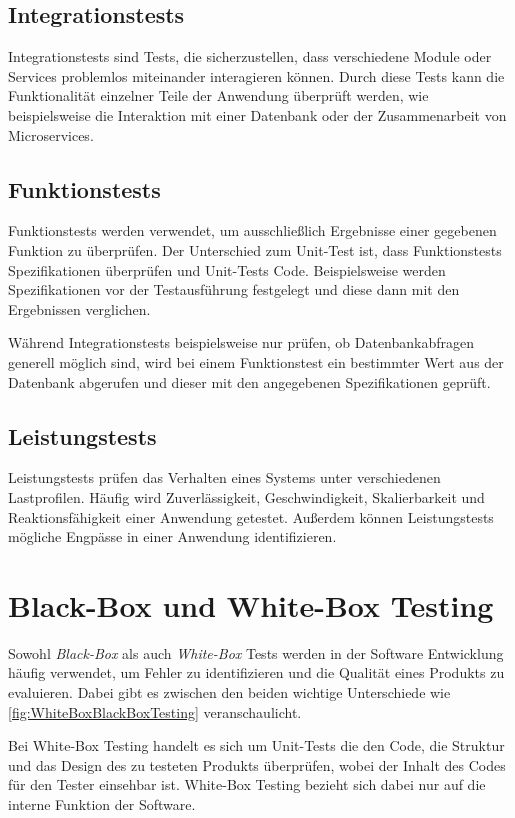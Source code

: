 \documentclass[a4paper, fontsize=11pt, parskip=half, twoside, headings=openright]{scrreprt}
\begin{document}
	\subsection{Integrationstests}
	Integrationstests sind Tests, die sicherzustellen, dass verschiedene Module oder Services problemlos miteinander interagieren können. 
	Durch diese Tests kann die Funktionalität einzelner Teile der Anwendung überprüft werden, wie beispielsweise die Interaktion mit einer Datenbank oder der Zusammenarbeit von Microservices.
	
	\subsection{Funktionstests}
	Funktionstests werden verwendet, um ausschließlich Ergebnisse einer gegebenen Funktion zu überprüfen.
	Der Unterschied zum Unit-Test ist, dass Funktionstests Spezifikationen überprüfen und Unit-Tests Code.
	Beispielsweise werden Spezifikationen vor der Testausführung festgelegt und diese dann mit den Ergebnissen verglichen.
	
	Während Integrationstests beispielsweise nur prüfen, ob Datenbankabfragen generell möglich sind, wird bei einem Funktionstest ein bestimmter Wert aus der Datenbank abgerufen und dieser mit den angegebenen Spezifikationen geprüft.
	
	\subsection{Leistungstests}
	Leistungstests prüfen das Verhalten eines Systems unter verschiedenen Lastprofilen. 
	Häufig wird Zuverlässigkeit, Geschwindigkeit, Skalierbarkeit und Reaktionsfähigkeit einer Anwendung getestet. 
	Außerdem können Leistungstests mögliche Engpässe in einer Anwendung identifizieren.
	
	
	\section{Black-Box und White-Box Testing}
	Sowohl \emph{Black-Box} als auch \emph{White-Box} Tests werden in der Software Entwicklung häufig verwendet, um Fehler zu identifizieren und die Qualität eines Produkts zu evaluieren. 
	Dabei gibt es zwischen den beiden wichtige Unterschiede wie \autoref{fig:WhiteBoxBlackBoxTesting} veranschaulicht.
	
	Bei White-Box Testing handelt es sich um Unit-Tests die den Code, die Struktur und das Design des zu testeten Produkts überprüfen, wobei der Inhalt des Codes für den Tester einsehbar ist.
	White-Box Testing bezieht sich dabei nur auf die interne Funktion der Software.
	
\end{document}
